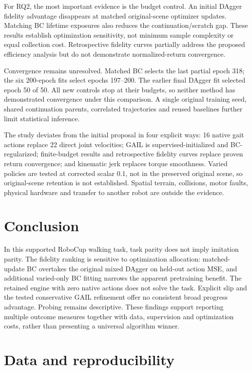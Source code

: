\documentclass[10pt,a4paper,twocolumn]{article}
\begin{document}
For RQ2, the most important evidence is the budget control. An initial DAgger fidelity advantage disappears at matched original-scene optimizer updates. Matching BC lifetime exposures also reduces the continuation/scratch gap. These results establish optimization sensitivity, not minimum sample complexity or equal collection cost. Retrospective fidelity curves partially address the proposed efficiency analysis but do not demonstrate normalized-return convergence.

Convergence remains unresolved. Matched BC selects the last partial epoch 318; the six 200-epoch fits select epochs 197--200. The earlier final DAgger fit selected epoch 50 of 50. All new controls stop at their budgets, so neither method has demonstrated convergence under this comparison. A single original training seed, shared continuation parents, correlated trajectories and reused baselines further limit statistical inference.

The study deviates from the initial proposal in four explicit ways: 16 native gait actions replace 22 direct joint velocities; GAIL is supervised-initialized and BC-regularized; finite-budget results and retrospective fidelity curves replace proven return convergence; and kinematic jerk replaces torque smoothness. Varied policies are tested at corrected scalar 0.1, not in the preserved original scene, so original-scene retention is not established. Spatial terrain, collisions, motor faults, physical hardware and transfer to another robot are outside the evidence.

\section{Conclusion}

In this supported RoboCup walking task, task parity does not imply imitation parity. The fidelity ranking is sensitive to optimization allocation: matched-update BC overtakes the original mixed DAgger on held-out action MSE, and additional varied-only BC fitting narrows the apparent pretraining benefit. The retained engine with zero native actions does not solve the task. Explicit slip and the tested conservative GAIL refinement offer no consistent broad progress advantage. Probing remains descriptive. These findings support reporting multiple outcome measures together with data, supervision and optimization costs, rather than presenting a universal algorithm winner.

\section*{Data and reproducibility}
\end{document}
